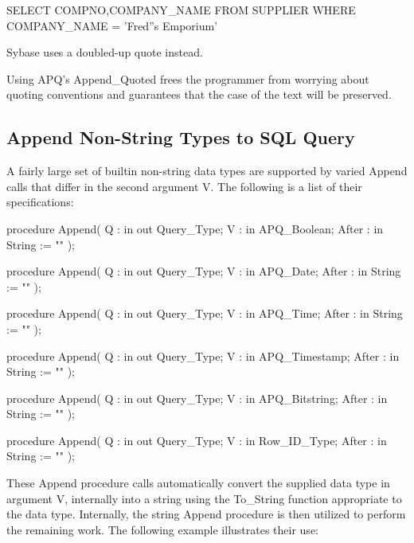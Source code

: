\documentclass[english,letterpaper]{book}
\begin{document}
\begin{SQL}
SELECT COMPNO,COMPANY_NAME
FROM SUPPLIER
WHERE COMPANY_NAME = 'Fred''s Emporium'
\end{SQL}

Sybase uses a doubled-up quote instead.

Using APQ's Append\_Quoted frees the programmer from worrying about
quoting conventions and guarantees that the case of the text will be
preserved.

\subsection{Append Non-String Types to SQL Query}

A fairly large set of builtin non-string data types are supported by varied
Append calls that differ in the second argument V. The following
is a list of their specifications:

\begin{Code}
procedure Append(
   Q :     in out Query_Type;
   V :     in     APQ_Boolean;
   After : in     String := ""
);
\end{Code}

\begin{Code}
procedure Append(
   Q :     in out Query_Type;
   V :     in     APQ_Date;
   After : in     String := ""
);
\end{Code}

\begin{Code}
procedure Append(
   Q :     in out Query_Type;
   V :     in     APQ_Time;
   After : in     String := ""
);
\end{Code}

\begin{Code}
procedure Append(
   Q :     in out Query_Type;
   V :     in     APQ_Timestamp;
   After : in     String := ""
);
\end{Code}

\begin{Code}
procedure Append(
   Q :     in out Query_Type;
   V :     in     APQ_Bitstring;
   After : in     String := ""
);
\end{Code}

\begin{Code}
procedure Append(
   Q :     in out Query_Type;
   V :     in     Row_ID_Type;
   After : in     String := ""
);
\end{Code}

These Append procedure calls automatically convert the supplied data
type in argument V, internally into a string using the To\_String function
appropriate to the data type. Internally, the string Append procedure
is then utilized to perform the remaining work. The following example
illustrates their use:
\end{document}
